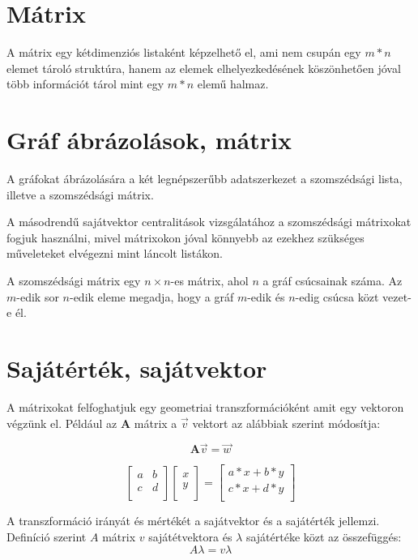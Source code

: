 \documentclass[12pt,numbers=noenddot]{report}
\begin{document}
\section{Mátrix}
A mátrix egy kétdimenziós listaként képzelhető el, ami nem csupán egy $m * n$ 
elemet tároló struktúra, hanem az elemek elhelyezkedésének köszönhetően jóval 
több információt tárol mint egy $m * n$ elemű halmaz.

\section{Gráf ábrázolások, mátrix}
A gráfokat ábrázolására a két legnépszerűbb adatszerkezet a szomszédsági lista, 
illetve a szomszédsági mátrix.

A másodrendű sajátvektor centralitások vizsgálatához a szomszédsági mátrixokat 
fogjuk használni, mivel mátrixokon jóval könnyebb az ezekhez szükséges 
műveleteket elvégezni mint láncolt listákon.

A szomszédsági mátrix egy $n \times n$-es mátrix, ahol $n$ a gráf csúcsainak 
száma. Az $m$-edik sor $n$-edik eleme megadja, hogy a gráf $m$-edik és 
$n$-edig csúcsa közt vezet-e él.


\pagebreak

\section{Sajátérték, sajátvektor}
A mátrixokat felfoghatjuk egy geometriai transzformációként amit egy vektoron 
végzünk el. Például az $\textbf{A}$ mátrix a $\vec{v}$ vektort az alábbiak 
szerint módosítja:

$$
\textbf{A} \vec{v} = \vec{w}
$$

$$
{
	\begin{bmatrix}
		a & b \\
		c & d \\
	\end{bmatrix}
}
{
	\begin{bmatrix}
		x \\
		y \\
	\end{bmatrix}
}
=
{
	\begin{bmatrix}
		a*x+b*y \\
		c*x+d*y \\
	\end{bmatrix}
}
$$

\vspace{1cm}

A transzformáció irányát és mértékét a sajátvektor és a sajátérték jellemzi.
Definíció szerint $A$ mátrix $v$ sajátétvektora és $\lambda$ sajátértéke 
közt az összefüggés: $$A \lambda = v \lambda$$
\end{document}

